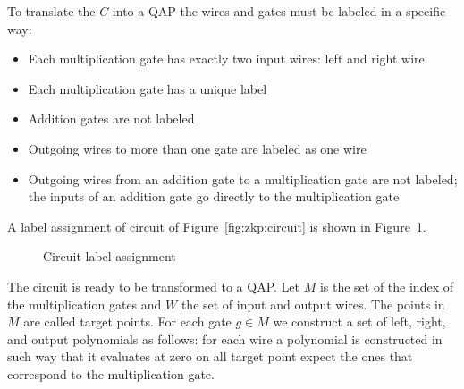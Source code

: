 To translate the $C$ into a QAP the wires and gates must be labeled in a specific way:

\begin{itemize}
  \item Each multiplication gate has exactly two input wires: left and right wire
  \item Each multiplication gate has a unique label
  \item Addition gates are not labeled
  \item Outgoing wires to more than one gate are labeled as one wire
  \item Outgoing wires from an addition gate to a multiplication gate are not labeled; the inputs of an addition gate go directly to the multiplication gate
\end{itemize}

A label assignment of circuit of Figure~\ref{fig:zkp:circuit} is shown in Figure~\ref{fig:zkp:circuit_label}.

\begin{figure}[ht!]
  \center
  \caption{Circuit label assignment}
  \label{fig:zkp:circuit_label}
\end{figure}

The circuit is ready to be transformed to a QAP. Let $M$ is the set of the index of the multiplication gates and $W$ the set of input and output wires. The points in $M$ are called target points. For each gate $g \in M$ we construct a set of left, right, and output polynomials as follows: for each wire a polynomial is constructed in such way that it evaluates at zero on all target point expect the ones that correspond to the multiplication gate.

